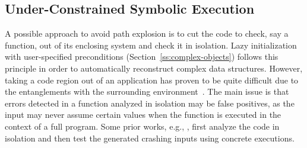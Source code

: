 \subsection{Under-Constrained Symbolic Execution} 
\label{under-constrained}

A possible approach to avoid path explosion is to cut the code to check, say a function, out of its enclosing system and check it in isolation. Lazy initialization with user-specified preconditions (Section~\ref{ss:complex-objects}) follows this principle in order to automatically reconstruct complex  data structures. However, taking a code region out of an application has proven to be quite difficult due to the entanglements with the surrounding environment~\cite{ED-ISSTA07}.
The main issue is that errors detected in a function analyzed in isolation may be false positives, as the input may never assume certain values when the function is executed in the context of a full program. Some prior works, e.g., \cite{CS-ICSE05}, first analyze the code in isolation and then test the generated crashing inputs using concrete executions.


